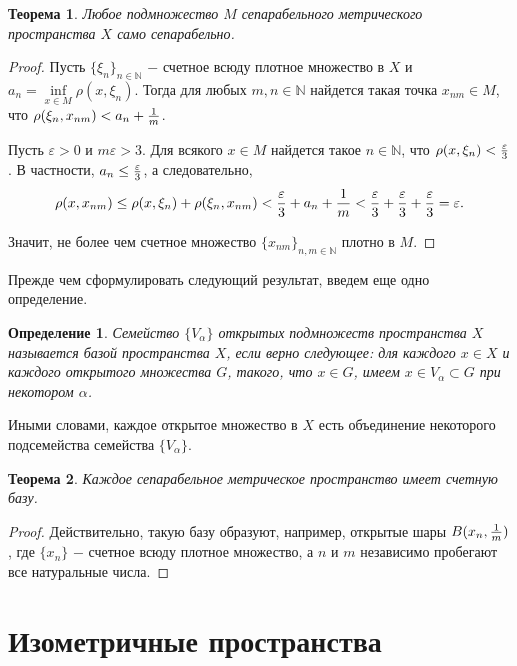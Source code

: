 \documentclass{article}
\newtheorem{theorem}{Теорема}[section]
\newtheorem{definition}{Определение}[section]
\begin{document}
\begin{theorem}
Любое подмножество \(M\) сепарабельного метрического пространства \(X\) само сепарабельно.
\end{theorem}

\begin{proof}
Пусть \(\{\xi_n\}_{n \in \mathbb{N}}\) \(-\) счетное всюду плотное множество в \(X\) и \(a_n = \inf\limits_{x \in M} {\rho(x, \xi_n)}\). Тогда для любых \(m, n \in \mathbb{N}\) найдется такая точка \(x_{nm} \in M\), что \(\rho(\xi_n, x_{nm}) < a_n + {1 \over m}\).

Пусть \(\varepsilon > 0\) и \(m\varepsilon > 3\). Для всякого \(x \in M\) найдется такое \(n \in \mathbb{N}\), что \(\rho(x, \xi_n) < {\varepsilon \over 3}\). В частности, \(a_n \leq {\varepsilon \over 3}\), а следовательно,
\[
\rho(x, x_{nm}) \leq \rho(x, \xi_n) + \rho(\xi_n, x_{nm}) < {\varepsilon \over 3} + a_n + {1 \over m} < {\varepsilon \over 3} + {\varepsilon \over 3} + {\varepsilon \over 3} = \varepsilon.
\]

Значит, не более чем счетное множество \(\{x_{nm}\}_{n, m \in \mathbb{N}}\) плотно в \(M\).
\end{proof}

Прежде чем сформулировать следующий результат, введем еще одно определение.

\begin{definition}
Семейство \(\{V_\alpha\}\) открытых подмножеств пространства \(X\) называется базой пространства \(X\), если верно следующее: для каждого \(x \in X\) и каждого открытого множества \(G\), такого, что \(x \in G\), имеем \(x \in V_\alpha \subset G\) при некотором \(\alpha\).
\end{definition}

Иными словами, каждое открытое множество в \(X\) есть объединение некоторого подсемейства семейства \(\{V_\alpha\}\).

\begin{theorem}
Каждое сепарабельное метрическое пространство имеет счетную базу.
\end{theorem}

\begin{proof}
Действительно, такую базу образуют, например, открытые шары \(B(x_n, {1 \over m})\), где \(\{x_{n}\}\) \(-\) счетное всюду плотное множество, а \(n\) и \(m\) независимо пробегают все натуральные числа.
\end{proof}

\section{Изометричные пространства}
\end{document}
